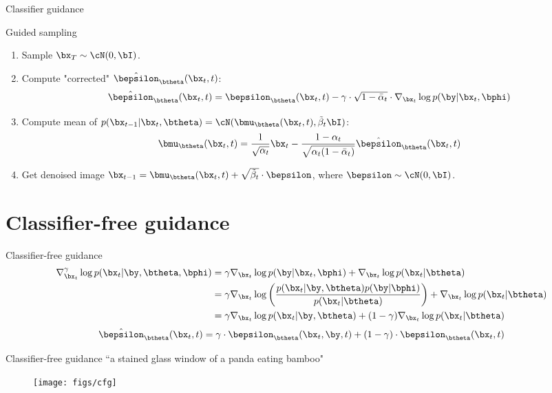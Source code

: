 \begin{frame}{Classifier guidance}
	\begin{block}{Guided sampling}
		\begin{enumerate}
			\item Sample $\bx_T \sim \cN(0, \bI)$.
			\item Compute "corrected" $\hat{\bepsilon}_{\btheta}(\bx_t, t)$:
			\[
				\hat{\bepsilon}_{\btheta}(\bx_t, t) = \bepsilon_{\btheta}(\bx_t, t) - \gamma \cdot \sqrt{1 - \bar{\alpha}_t} \cdot \nabla_{\bx_t} \log p(\by | \bx_t, \bphi)
			\]
			\item Compute mean of $p(\bx_{t-1} | \bx_t, \btheta) = \cN(\bmu_{\btheta}(\bx_t, t), \tilde{\beta}_t \bI)$:
			\[
				\bmu_{\btheta}(\bx_t, t) = \frac{1}{\sqrt{\alpha_t}} \bx_t - \frac{1 - \alpha_t}{\sqrt{\alpha_t (1 - \bar{\alpha}_t)}} \hat{\bepsilon}_{\btheta}(\bx_t, t)
			\]
			\vspace{-0.3cm}
			\item Get denoised image $\bx_{t - 1} = \bmu_{\btheta}(\bx_t, t) +  \sqrt{\tilde{\beta}_t} \cdot \bepsilon$, where $\bepsilon \sim \cN(0, \bI)$.
		\end{enumerate}
	\end{block}
\end{frame}
\section{Classifier-free guidance}
\begin{frame}{Classifier-free guidance}
	\begin{align*}
		\nabla_{\bx_t}^{\gamma} \log p(\bx_t | \by, \btheta, \bphi) &= \gamma \nabla_{\bx_t} \log p(\by | \bx_t, \bphi) + \nabla_{\bx_t} \log p(\bx_t | \btheta) \\
		&= \gamma \nabla_{\bx_t} \log \left(\frac{p(\bx_t| \by, \btheta) p(\by | \bphi)}{p(\bx_t | \btheta)}\right) + \nabla_{\bx_t} \log p(\bx_t | \btheta)\\
				&= \gamma \nabla_{\bx_t} \log p(\bx_t| \by, \btheta) + (1 - \gamma) \nabla_{\bx_t} \log p(\bx_t | \btheta)
	\end{align*}
	\[
		\hat{\bepsilon}_{\btheta}(\bx_t, t) = \gamma \cdot \bepsilon_{\btheta}(\bx_t, \by, t) + (1 - \gamma) \cdot \bepsilon_{\btheta}(\bx_t, t)
	\]
\end{frame}
\begin{frame}{Classifier-free guidance}
	“a stained glass window of a panda eating bamboo"
	\begin{figure}
		\texttt{[image: figs/cfg]}
	\end{figure}
\end{frame}
